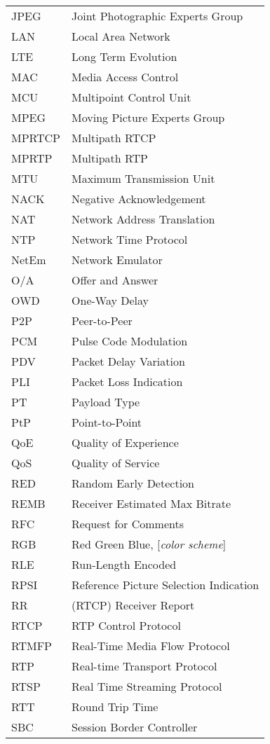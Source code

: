\begin{longtable}{ll}
JPEG 	& Joint Photographic Experts Group \\
LAN 	& Local Area Network \\
LTE 	& Long Term Evolution \\
MAC 	& Media Access Control \\
MCU 	& Multipoint Control Unit \\
MPEG 	& Moving Picture Experts Group \\
MPRTCP	& Multipath RTCP \\
MPRTP 	& Multipath RTP \\
MTU  	& Maximum Transmission Unit \\
NACK 	& Negative Acknowledgement \\
NAT 	& Network Address Translation \\
NTP  	& Network Time Protocol \\
NetEm 	& Network Emulator \\
O/A  	& Offer and Answer \\
OWD 	& One-Way Delay \\
P2P 	& Peer-to-Peer \\
PCM 	& Pulse Code Modulation \\
PDV  	& Packet Delay Variation \\
PLI 	& Packet Loss Indication \\
PT  	& Payload Type \\
PtP 	& Point-to-Point \\
QoE 	& Quality of Experience \\
QoS 	& Quality of Service \\
RED 	& Random Early Detection \\
REMB 	& Receiver Estimated Max Bitrate \\
RFC 	& Request for Comments \\
RGB 	& Red Green Blue, [\textit{color scheme}] \\
RLE  	& Run-Length Encoded \\
RPSI 	& Reference Picture Selection Indication \\
RR  	& (RTCP) Receiver Report \\
RTCP 	& RTP Control Protocol \\
RTMFP	& Real-Time Media Flow Protocol \\
RTP 	& Real-time Transport Protocol \\
RTSP 	& Real Time Streaming Protocol \\
RTT 	& Round Trip Time \\
SBC  	& Session Border Controller \\

\end{longtable}
